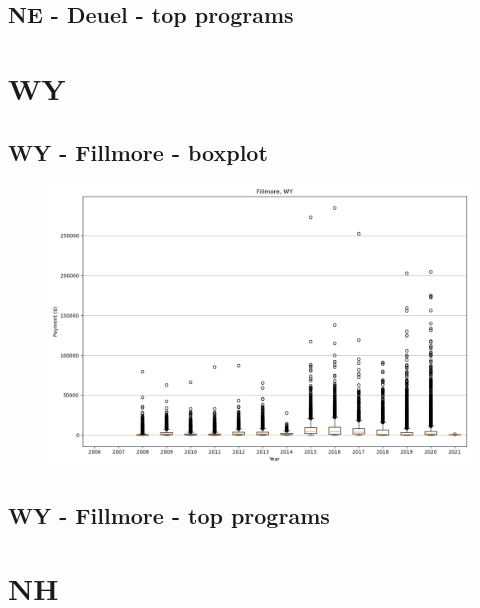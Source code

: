 \subsection*{NE - Deuel - top programs}

\newpage
\section*{WY}
\subsection*{WY - Fillmore - boxplot}
\begin{figure}[h]
\centering
\includegraphics[width=7in]{../output/boxplots/counties/Fillmore-WY_boxplot.png}
\end{figure}


\subsection*{WY - Fillmore - top programs}

\newpage
\section*{NH}
